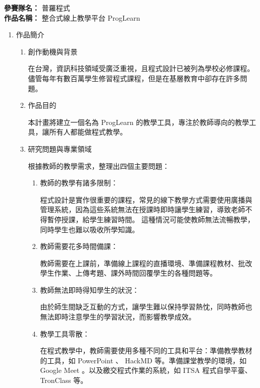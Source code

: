 \documentclass[12pt]{article}
\begin{document}
\date{}
\usetikzlibrary{automata, positioning, arrows}
{}

\noindent
\textbf{參賽隊名：} 普羅程式 \\
\textbf{作品名稱：} 整合式線上教學平台 ProgLearn

\begin{enumerate}
  \setlength{\parindent}{2em}
  \item 作品簡介
  \begin{enumerate}
    \setlength{\parindent}{2em}
    \item 創作動機與背景
    \par 在台灣，資訊科技領域受廣泛重視，且程式設計已被列為學校必修課程\cite{ref2}。
    儘管每年有數百萬學生修習程式課程\cite{ref3}，但是在基層教育中卻存在許多問題。
    \item 作品目的
    \par 本計畫將建立一個名為 ProgLearn 的教學工具，專注於教師導向的教學工具，讓所有人都能做程式教學。
    \item 研究問題與專業領域
    \par 根據教師的教學需求，整理出四個主要問題：
    \begin{enumerate}[label=(\arabic*)]
      \setlength{\parindent}{2em}
      \item 教師的教學有諸多限制：
        \par 程式設計是實作很重要的課程，常見的線下教學方式需要使用廣播與管理系統，因為這些系統無法在授課時即時讓學生練習，導致老師不得暫停授課，給學生練習時間。
        這種情況可能使教師無法流暢教學，同時學生也難以吸收所學知識。
      \item 教師需要花多時間備課：
        \par 教師需要在上課前，準備線上課程的直播環境、準備課程教材、批改學生作業、上傳考題、課外時間回覆學生的各種問題等\cite{ref4}。
      \item 教師無法即時得知學生的狀況：
        \par 由於師生間缺乏互動的方式，讓學生難以保持學習熱忱，同時教師也無法即時注意學生的學習狀況，而影響教學成效\cite{ref7}。
      \item 教學工具零散：
        \par 在程式教學中，教師需要使用多種不同的工具和平台：準備教學教材的工具，如 PowerPoint 、 HackMD 等。準備課堂教學的環境，如 Google Meet 。以及繳交程式作業的系統，如 ITSA 程式自學平臺、TronClass 等。

\end{enumerate}
\end{enumerate}
\end{enumerate}
\end{document}
